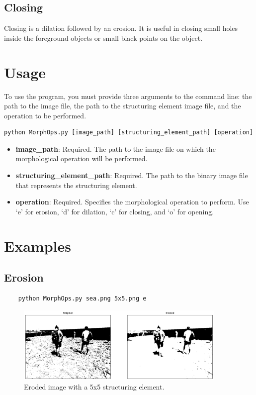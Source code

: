 \documentclass[12pt]{article}
\begin{document}
\subsection{Closing}
Closing is a dilation followed by an erosion. It is useful in closing small holes inside the foreground objects or small black points on the object.

\section*{Usage}

To use the program, you must provide three arguments to the command line: the path to the image file, the path to the structuring element image file, and the operation to be performed.

\begin{verbatim}
python MorphOps.py [image_path] [structuring_element_path] [operation]
\end{verbatim}

\begin{itemize}
    \item \textbf{image\_path}: Required. The path to the image file on which the morphological operation will be performed.
    \item \textbf{structuring\_element\_path}: Required. The path to the binary image file that represents the structuring element.
    \item \textbf{operation}: Required. Specifies the morphological operation to perform. Use `e' for erosion, `d' for dilation, `c' for closing, and `o' for opening.
\end{itemize}

\section*{Examples}
\subsection{Erosion}
\begin{verbatim}
    python MorphOps.py sea.png 5x5.png e
\end{verbatim}
\begin{figure}[h!]
    \centering
    \includegraphics[width=0.9\textwidth]{erosion.png}
    \caption{Eroded image with a 5x5 structuring element.}
\end{figure}
\newpage
\end{document}
